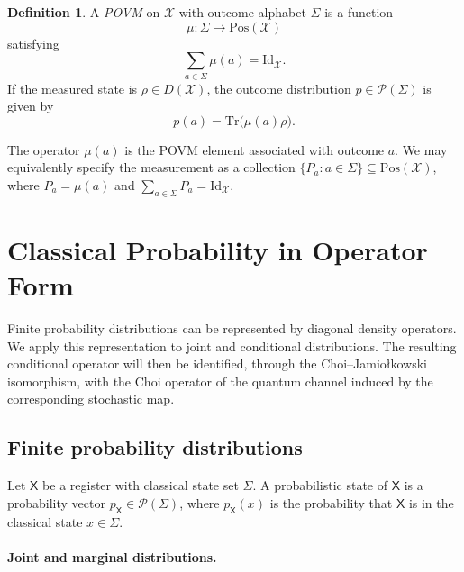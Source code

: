 \documentclass[
    aps,
    pra,
    reprint,
    superscriptaddress,
    nofootinbib
]{revtex4-2}
\theoremstyle{definition}
\newtheorem{definition}{Definition}[section]
\theoremstyle{plain}
\begin{document}
\begin{definition}
    A \emph{POVM} on $\mathcal{X}$ with outcome alphabet $\Sigma$ is a
    function
    \begin{equation}
        \mu:\Sigma\to\mathrm{Pos}(\mathcal{X})
    \end{equation}
    satisfying
    \begin{equation}
        \sum_{a\in\Sigma}\mu(a)=\mathrm{Id}_{\mathcal{X}}.
    \end{equation}
    If the measured state is $\rho\in D(\mathcal{X})$, the outcome
    distribution $p\in\mathcal{P}(\Sigma)$ is given by
    \begin{equation}
        p(a)=\mathrm{Tr}\bigl(\mu(a)\rho\bigr).
    \end{equation}
\end{definition}

The operator $\mu(a)$ is the POVM element associated with outcome $a$. We
may equivalently specify the measurement as a collection
$\{P_a:a\in\Sigma\}\subseteq\mathrm{Pos}(\mathcal{X})$, where
$P_a=\mu(a)$ and $\sum_{a\in\Sigma}P_a=\mathrm{Id}_{\mathcal{X}}$.


\section{Classical Probability in Operator Form}
\label{sec:classical-probability-operator}

Finite probability distributions can be represented by diagonal density
operators. We apply this representation to joint and conditional
distributions. The resulting conditional operator will then be identified,
through the Choi--Jamio{\l}kowski isomorphism, with the Choi operator of the
quantum channel induced by the corresponding stochastic map.

\subsection{Finite probability distributions}

Let $\mathsf{X}$ be a register with classical state set $\Sigma$. A
probabilistic state of $\mathsf{X}$ is a probability vector
$p_{\mathsf{X}}\in\mathcal{P}(\Sigma)$, where
$p_{\mathsf{X}}(x)$ is the probability that $\mathsf{X}$ is in the
classical state $x\in\Sigma$.

\paragraph{Joint and marginal distributions.}
\end{document}
